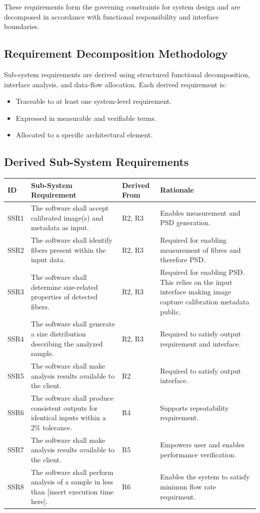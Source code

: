 \documentclass[11pt,a4paper]{article}
\begin{document}
These requirements form the governing constraints for system design and are decomposed in accordance with functional responsibility and interface boundaries.

\subsection{Requirement Decomposition Methodology}

Sub-system requirements are derived using structured functional decomposition, interface analysis, and data-flow allocation. Each derived requirement is:

\begin{itemize}
    \item Traceable to at least one system-level requirement.
    \item Expressed in measurable and verifiable terms.
    \item Allocated to a specific architectural element.
\end{itemize}

\subsection{Derived Sub-System Requirements}

\begin{longtable}{@{}p{1cm}p{6cm}p{2cm}p{6cm}@{}}
\toprule
\textbf{ID} & \textbf{Sub-System Requirement} & \textbf{Derived From} & \textbf{Rationale} \\
\midrule
\endhead
SSR1 & The software shall accept calibrated image(s) and metadata as input. & R2, R3 & Enables measurement and PSD generation. \\ \midrule
SSR2 & The software shall identify fibers present within the input data. & R2, R3 & Required for enabling measurement of fibres and therefore PSD. \\ \midrule
SSR3 & The software shall determine size-related properties of detected fibers. & R2, R3 & Required for enabling PSD. This relies on the input interface making image capture calibration metadata public. \\ \midrule
SSR4 & The software shall generate a size distribution describing the analyzed sample. & R2, R3 & Required to satisfy output requirement and interface. \\ \midrule
SSR5 & The software shall make analysis results available to the client. & R2 & Required to satisfy output interface. \\ \midrule
SSR6 & The software shall produce consistent outputs for identical inputs within a 2\% tolerance. & R4 & Supports repeatability requirement. \\ \midrule
SSR7 & The software shall make analysis results available to the client. & R5 & Empowers user and enables performance verification. \\ \midrule
SSR8 & The software shall perform analysis of a sample in less than [insert execution time here]. & R6 & Enables the system to satisfy minimun flow rate requirment. \\
\bottomrule
\end{longtable}
\end{document}
